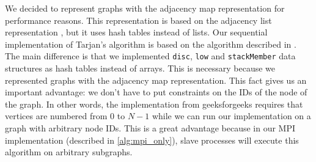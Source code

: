 \label{alg:sequential}
We decided to represent graphs with the adjacency map representation for performance reasons. This representation is based on the adjacency list representation \cite{wiki:Adjacency_list}, but it uses hash tables \cite{attractivechaos_2018} instead of lists. Our sequential implementation of Tarjan's algorithm is based on the algorithm described in \cite{geeksforgeeks}. The main difference is that we implemented \verb|disc|, \verb|low| and \verb|stackMember| data structures as hash tables instead of arrays. This is necessary because we represented graphs with the adjacency map representation. This fact gives us an important advantage: we don't have to put constraints on the IDs of the node of the graph. In other words, the implementation from geeksforgeeks requires that vertices are numbered from $0$ to $N-1$ while we can run our implementation on a graph with arbitrary node IDs. This is a great advantage because in our MPI implementation (described in \ref{alg:mpi_only}), slave processes will execute this algorithm on arbitrary subgraphs.